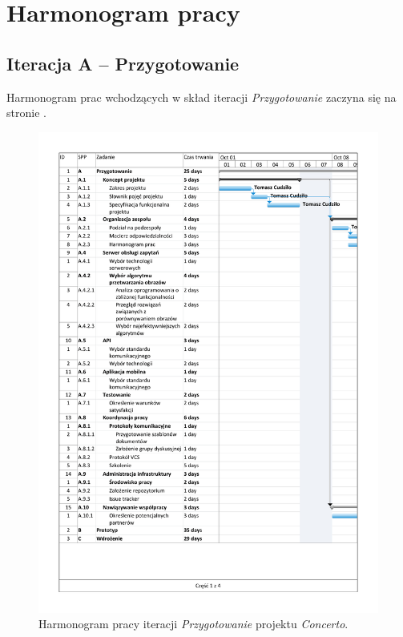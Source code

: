 \documentclass[10pt]{dokument-ppi}
\begin{document}
\MakeDokumentMeta


\section{Harmonogram pracy}

\subsection{Iteracja A -- Przygotowanie}

Harmonogram prac wchodzących w skład iteracji \emph{Przygotowanie}
zaczyna się na stronie \pageref{fig:iteracja-przygotowanie}.

\begin{figure}[p]
    \includegraphics[trim=1.2cm 1.2cm 1.2cm 1.2cm,page=1,width=\textwidth]{./figury/organizacja-pracy-A-przygotowanie}
    \caption{Harmonogram pracy iteracji \emph{Przygotowanie} projektu \emph{Concerto}.}
    \label{fig:iteracja-przygotowanie}
\end{figure}
\end{document}
